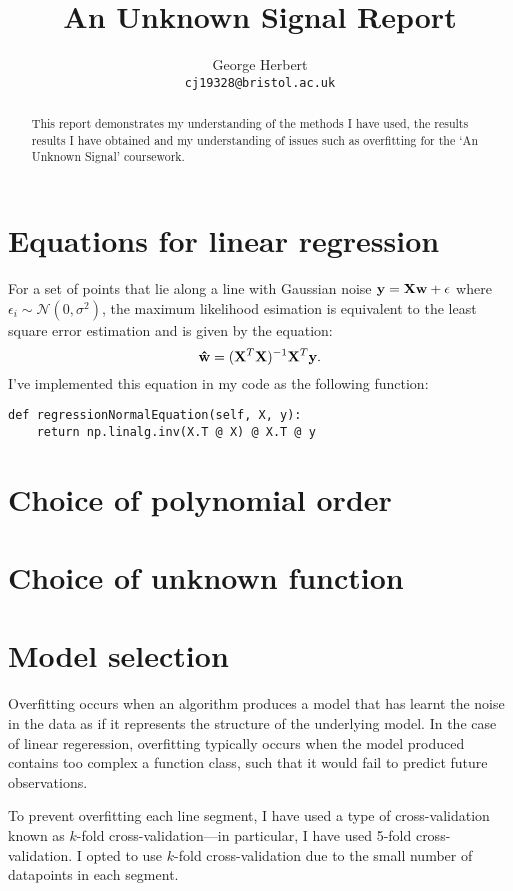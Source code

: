 \documentclass[onecolumn, 12pt, a4paper]{article}
\author{
  George Herbert\\
  \texttt{cj19328@bristol.ac.uk}
}
\title{An Unknown Signal Report}
\begin{document}
\maketitle

\begin{abstract}
    This report demonstrates my understanding of the methods I have 
    used, the results results I have obtained and my understanding
    of issues such as overfitting for the `An Unknown Signal'
    coursework.
\end{abstract}

\section{Equations for linear regression}

For a set of points that lie along a line with Gaussian noise 
$\vb{y} = \vb{X}\vb{w} + \vb{\epsilon}$ where $\epsilon_{i} \sim \mathcal{N}(0, \sigma^{2})$,
the maximum likelihood esimation is equivalent to the least square 
error estimation and is given by the equation:
\[
    \vb{\hat{w}} = (\vb{X}^{T}\vb{X})^{-1}\vb{X}^{T}\vb{y}.
\]
I've implemented this equation in my code as the following function:
\begin{verbatim}
def regressionNormalEquation(self, X, y):
    return np.linalg.inv(X.T @ X) @ X.T @ y
\end{verbatim}

\section{Choice of polynomial order}

\section{Choice of unknown function}

\section{Model selection}

Overfitting occurs when an algorithm produces a model that has
learnt the noise in the data as if it represents the
structure of the underlying model.
In the case of linear regeression, overfitting typically occurs
when the model produced contains too complex a function class,
such that it would fail to predict future observations.

To prevent overfitting each line segment, I have used a type of 
cross-validation known as $k$-fold cross-validation---in particular,
I have used 5-fold cross-validation. 
I opted to use $k$-fold cross-validation due to the small number
of datapoints in each segment.
\end{document}
